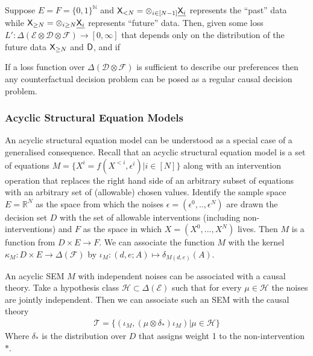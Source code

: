Suppose $E=F=\{0,1\}^\mathbb{N}$ and $\mathsf{X}_{<N}=\otimes_{i\in [N-1]} \underline{\mathsf{X}_i}$ represents the ``past'' data while $\mathsf{X}_{\geq N}=\otimes_{i\geq N} \underline{\mathsf{X}_i}$ represents ``future'' data. Then, given some loss $L':\Delta(\mathcal{E}\otimes \mathcal{D}\otimes\mathcal{F})\to[0,\infty]$ that depends only on the distribution of the future data $\mathsf{X}_{\geq N}$ and $\mathsf{D}$, and if 

If a loss function over $\Delta(\mathcal{D}\otimes\mathcal{F})$ is sufficient to describe our preferences then any counterfactual decision problem can be posed as a regular causal decision problem.

\subsubsection{Acyclic Structural Equation Models}

An acyclic structural equation model can be understood as a special case of a generalised consequence. Recall that an acyclic structural equation model is a set of equations $M=\{X^i = f(X^{<i},\epsilon^i)|i\in[N]\}$ along with an intervention operation that replaces the right hand side of an arbitrary subset of equations with an arbitrary set of (allowable) chosen values. Identify the sample space $E=\mathbb{R}^N$ as the space from which the noises $\epsilon=(\epsilon^0,..,\epsilon^N)$ are drawn the decision set $D$ with the set of allowable interventions (including non-interventions) and $F$ as the space in which $X=(X^0,...,X^N)$ lives. Then $M$ is a function from $D\times E\to F$. We can associate the function $M$ with the kernel $\kappa_M: D\times E\to \Delta(\mathcal{F})$ by $\iota_M:(d,e;A)\mapsto \delta_{M(d,e)}(A)$.

An acyclic SEM $M$ with independent noises can be associated with a causal theory. Take a hypothesis class $\mathscr{H}\subset\Delta(\mathcal{E})$ such that for every $\mu\in\mathscr{H}$ the noises are jointly independent. Then we can associate such an SEM with the causal theory
\begin{align}
    \mathscr{T} = \{(\iota_M,(\mu\otimes \delta_*)\iota_M )|\mu\in\mathscr{H}\}
\end{align}
Where $\delta_*$ is the distribution over $D$ that assigns weight 1 to the non-intervention $*$.